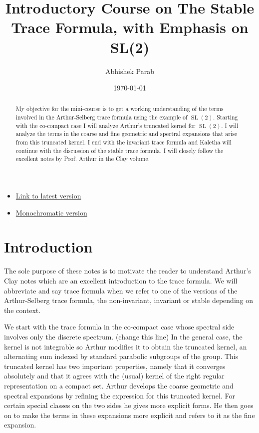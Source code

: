 \documentclass[11pt]{amsart}
\def\sl{\operatorname{SL}}
\theoremstyle{remark}
\begin{document}
\title{Introductory Course on The Stable Trace Formula, with Emphasis on SL(2)}
\author{Abhishek Parab}
\date{\today}                       %

\maketitle
\setcounter{tocdepth}{1}		%

\begin{itemize}
	\item \href{https://www.dropbox.com/s/155lg41rwiberbu/invariant_sl2.pdf?dl=0}{Link to latest version}
	\item \href{https://www.dropbox.com/s/p8942kgaygr8tfv/invariant_sl2_print.pdf?dl=0}{Monochromatic version}
\end{itemize}


\begin{abstract}
	My objective for the mini-course is to get a working understanding of the terms involved in the Arthur-Selberg trace formula using the example of $\sl(2)$. Starting with the co-compact case I will analyze Arthur's truncated kernel for $\sl(2)$. I will analyze the terms in the coarse and fine geometric and spectral expansions that arise from this truncated kernel. I end with the invariant trace formula and Kaletha will continue with the discussion of the stable trace formula. I will closely follow the excellent notes by Prof. Arthur in the Clay volume. 
\end{abstract}

\tableofcontents


\section{Introduction} \label{sec_intro}
	
	The sole purpose of these notes is to motivate the reader to understand Arthur's Clay notes \cite{clay} which are an excellent introduction to the trace formula. We will abbreviate and say trace formula when we refer to one of the versions of the Arthur-Selberg trace formula, the non-invariant, invariant or stable depending on the context. 
	
	We start with the trace formula in the co-compact case whose spectral side involves only the discrete spectrum. (change this line) In the general case, the kernel is not integrable so Arthur modifies it to obtain the truncated kernel, an alternating sum indexed by standard parabolic subgroups of the group. This truncated kernel has two important properties, namely that it converges absolutely and that it agrees with the (usual) kernel of the right regular representation on a compact set. Arthur develops the coarse geometric and spectral expansions by refining the expression for this truncated kernel. For certain special classes on the two sides he gives more explicit forms. He then goes on to make the terms in these expansions more explicit and refers to it as the fine expansion. 
	
\end{document}
